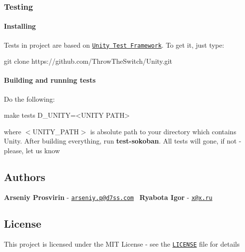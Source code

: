  \subsubsection*{Testing}

\paragraph*{Installing}

Tests in project are based on \href{http://www.throwtheswitch.org/unity}{\tt Unity Test Framework}. To get it, just type\+: 
\begin{DoxyCode}
git clone https:\textcolor{comment}{//github.com/ThrowTheSwitch/Unity.git}
\end{DoxyCode}
 \paragraph*{Building and running tests}

Do the following\+: 
\begin{DoxyCode}
make tests D\_UNITY=<UNITY PATH>
\end{DoxyCode}
 where $<$\+U\+N\+I\+T\+Y\+\_\+\+P\+A\+T\+H$>$ is absolute path to your directory which contains Unity. After building everything, run {\bfseries test-\/sokoban}. All tests will gone, if not -\/ please, let us know \subsection*{Authors}

{\bfseries Arseniy Prosvirin} -\/ \href{mailto:arseniy.p@d7ss.com}{\tt arseniy.\+p@d7ss.\+com}~\newline
 {\bfseries Ryabota Igor} -\/ \href{mailto:x@x.ru}{\tt x@x.\+ru} \subsection*{License}

This project is licensed under the M\+IT License -\/ see the \href{https://github.com/arseniy899/sokoban_pub/blob/master/LICENSE}{\tt L\+I\+C\+E\+N\+SE} file for details 